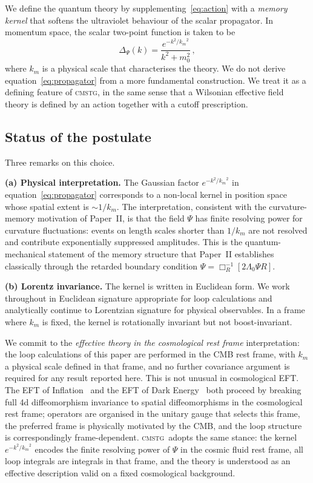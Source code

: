 \documentclass[12pt,a4paper]{article}
\newcommand{\CMSTG}{\textsc{cmstg}}
\newcommand{\Lz}{{\Lambda_0}}
\newcommand{\km}{{k_m}}
\begin{document}
We define the quantum theory by supplementing~\eqref{eq:action} with a
\emph{memory kernel} that softens the ultraviolet behaviour of the scalar
propagator. In momentum space, the scalar two-point function is taken to be
\begin{equation}
  \Delta_\Psi(k) = \frac{e^{-k^2/\km^2}}{k^2 + m_0^2}\,,
  \label{eq:propagator}
\end{equation}
where $\km$ is a physical scale that characterises the theory. We do not derive
equation~\eqref{eq:propagator} from a more fundamental construction. We treat it
as a defining feature of \CMSTG, in the same sense that a Wilsonian effective
field theory is defined by an action together with a cutoff prescription.

\subsection{Status of the postulate}

Three remarks on this choice.

\textbf{(a) Physical interpretation.} The Gaussian factor $e^{-k^2/\km^2}$ in
equation~\eqref{eq:propagator} corresponds to a non-local kernel in position
space whose spatial extent is ${\sim}1/\km$. The interpretation, consistent with
the curvature-memory motivation of Paper~II, is that the field $\Psi$ has finite
resolving power for curvature fluctuations: events on length scales shorter than
$1/\km$ are not resolved and contribute exponentially suppressed amplitudes. This
is the quantum-mechanical statement of the memory structure that Paper~II
establishes classically through the retarded boundary condition
$\Psi = \Box_R^{-1}[2\Lz\Psi R]$.

\textbf{(b) Lorentz invariance.} The kernel is written in Euclidean form. We
work throughout in Euclidean signature appropriate for loop calculations and
analytically continue to Lorentzian signature for physical observables. In a
frame where $\km$ is fixed, the kernel is rotationally invariant but not
boost-invariant.

We commit to the \emph{effective theory in the cosmological rest frame}
interpretation: the loop calculations of this paper are performed in the CMB
rest frame, with $\km$ a physical scale defined in that frame, and no further
covariance argument is required for any result reported here. This is not
unusual in cosmological EFT. The EFT of Inflation~\cite{Cheung2008} and the
EFT of Dark Energy~\cite{Gubitosi2013} both proceed by breaking full 4d
diffeomorphism invariance to spatial diffeomorphisms in the cosmological rest
frame; operators are organised in the unitary gauge that selects this frame,
the preferred frame is physically motivated by the CMB, and the loop structure
is correspondingly frame-dependent. \CMSTG\ adopts the same stance: the kernel
$e^{-k^2/\km^2}$ encodes the finite resolving power of $\Psi$ in the cosmic
fluid rest frame, all loop integrals are integrals in that frame, and the
theory is understood as an effective description valid on a fixed cosmological
background.
\end{document}
